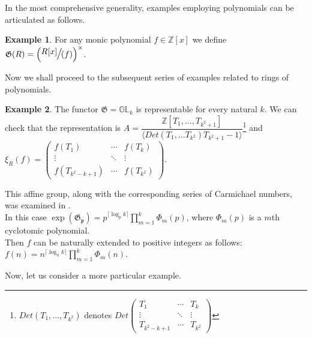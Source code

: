 \documentclass{article}
\theoremstyle{definition}
\newtheorem{example}{Example}
\theoremstyle{definition}
\begin{document}
In the most comprehensive generality, examples employing polynomials can be articulated as follows.
\begin{example} For any monic polynomial $f \in \mathbb{Z}[x]$ we define
    $\mathfrak{G}(R) =\Large{\left( \sfrac{R[x]}{(f)}\right)^{\times}}$.
\end{example}

Now we shall proceed to the subsequent series of examples related to rings of polynomials.
    
\begin{example}
The functor $\mathfrak {G} = \mathbb{GL}_{k}$ is representable for every natural $k.$ We can check that the representation is 
$A = \dfrac{\mathbb{Z}[T_1, ..., T_{k^2+1}]}{\langle Det(T_1, ... T_{k^2})T_{k^2+1}-1 \rangle}$\footnote{$Det(T_1, ..., T_{k^2})$ 
denotes $Det\begin{pmatrix}
  T_1 & \cdots & T_k\\
  \vdots & \ddots &  \vdots\\
  T_{k^2-k+1} & \cdots & T_{k^2} 
 \end{pmatrix}$} and $\xi_R(f)=\begin{pmatrix}
  f(T_1) & \cdots & f(T_k)\\
  \vdots & \ddots &  \vdots\\
  f(T_{k^2-k+1}) & \cdots & f(T_{k^2}) 
 \end{pmatrix}$.

This affine group, along with the corresponding series of Carmichael numbers, was examined in \cite{1}.\\

In this case $\operatorname{exp}(\mathfrak{G_p}) = p^{\lceil\log _p k\rceil} \prod_{m=1}^k \Phi_m(p)$, 
where $\Phi_m(p)$ is a $m$th cyclotomic polynomial.\\

Then $f$ can be naturally extended to positive integers as follows: $f(n) = n^{\lceil\log _n k\rceil} \prod_{m=1}^k \Phi_m(n)$.\\
\end{example}


Now, let us consider a more particular example.
\end{document}
